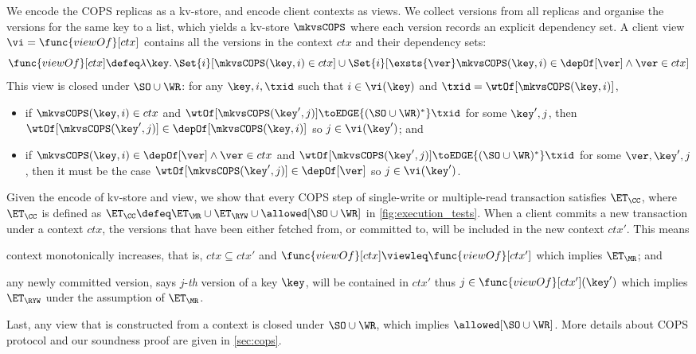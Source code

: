 We encode the COPS replicas as a kv-store, and encode client contexts as views.  
We collect versions from all replicas and organise the versions for the same key to a list,
which yields a kv-store \( \mkvsCOPS \) where each version records an explicit dependency set.
A client view \( \vi =  \func{viewOf}[ctx] \) contains all the versions in the context \( ctx \) and their dependency sets:
\[
    \func{viewOf}[ctx] \defeq \lambda \key \ldotp \Set{i}[\mkvsCOPS(\key,i) \in ctx] 
                            \cup \Set{i}[\exsts{\ver} \mkvsCOPS(\key,i) \in \depOf[\ver] \land \ver \in ctx]  
\]
This view is closed under \( \SO \cup \WR \):
for any \( \key, i, \txid\) such that \( i \in \vi(\key) \) and \( \txid = \wtOf[\mkvsCOPS(\key,i)]\),
\begin{itemize}
    \item if \( \mkvsCOPS(\key,i) \in ctx \) and \( \wtOf[\mkvsCOPS(\key',j)] \toEDGE{(\SO \cup \WR)^*} \txid \) for some \( \key',j \),
        then \( \wtOf[\mkvsCOPS(\key',j)] \in \depOf[\mkvsCOPS(\key,i)] \) so \( j \in \vi(\key') \); and
    \item if \( \mkvsCOPS(\key,i) \in \depOf[\ver] \land \ver \in ctx \) and 
        \( \wtOf[\mkvsCOPS(\key',j)] \toEDGE{(\SO \cup \WR)^*} \txid \) for some \( \ver,\key',j \),
        then it must be the case \( \wtOf[\mkvsCOPS(\key',j)]  \in \depOf[\ver] \) so \( j \in \vi(\key') \).
\end{itemize}

Given the encode of kv-store and view, we show that every COPS step 
of single-write or multiple-read transaction satisfies $\ET_\CC$,
where $\ET_\CC$ is defined as \( \ET_\CC \defeq \ET_\MR \cup \ET_\RYW \cup \allowed[\SO \cup \WR] \) 
in \cref{fig:execution_tests}.
When a client commits a new transaction under a context \( ctx \), 
the versions that have been either fetched from, or committed to, will be included in the new context \( ctx' \).
This means 
\begin{enumerate*} 
    \item context monotonically increases, that is, 
    \( ctx \subseteq ctx' \) and \( \func{viewOf}[ctx] \viewleq \func{viewOf}[ctx']\) which implies \(\ET_\MR\);
    and 
    \item any newly committed version, says \(j\)-\emph{th} version of a key \(\key\), will be contained in \( ctx' \)
    thus \( j \in \func{viewOf}[ctx'](\key') \) which implies \(\ET_\RYW \) under the assumption of \(\ET_\MR\).
\end{enumerate*}
Last, any view that is constructed from a context is closed under \( \SO \cup \WR \), which implies \( \allowed[\SO \cup \WR] \).
More details about COPS protocol and our soundness proof are given in \cref{sec:cops}.

